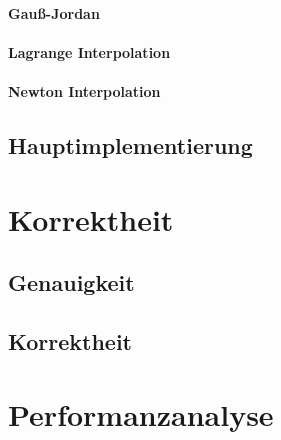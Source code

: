 \documentclass[course=erap]{aspdoc}
\begin{document}
\paragraph{Gauß-Jordan}

\paragraph{Lagrange Interpolation}
\paragraph{Newton Interpolation}

\subsection{Hauptimplementierung}


\section{Korrektheit}
\subsection{Genauigkeit}
\subsection{Korrektheit}

\section{Performanzanalyse}
\end{document}
